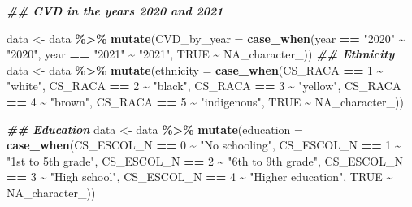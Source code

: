 \documentclass[
]{article}
\newenvironment{Shaded}{\begin{snugshade}}{\end{snugshade}}
\newcommand{\AttributeTok}[1]{\textcolor[rgb]{0.13,0.29,0.53}{#1}}
\newcommand{\ConstantTok}[1]{\textcolor[rgb]{0.56,0.35,0.01}{#1}}
\newcommand{\DecValTok}[1]{\textcolor[rgb]{0.00,0.00,0.81}{#1}}
\newcommand{\DocumentationTok}[1]{\textcolor[rgb]{0.56,0.35,0.01}{\textbf{\textit{#1}}}}
\newcommand{\FunctionTok}[1]{\textcolor[rgb]{0.13,0.29,0.53}{\textbf{#1}}}
\newcommand{\NormalTok}[1]{#1}
\newcommand{\OtherTok}[1]{\textcolor[rgb]{0.56,0.35,0.01}{#1}}
\newcommand{\SpecialCharTok}[1]{\textcolor[rgb]{0.81,0.36,0.00}{\textbf{#1}}}
\newcommand{\StringTok}[1]{\textcolor[rgb]{0.31,0.60,0.02}{#1}}
\begin{document}
\begin{Shaded}
\begin{Highlighting}[]
\DocumentationTok{\#\# CVD in the years 2020 and 2021}

\NormalTok{data }\OtherTok{\textless{}{-}}\NormalTok{ data }\SpecialCharTok{\%\textgreater{}\%} \FunctionTok{mutate}\NormalTok{(}\AttributeTok{CVD\_by\_year =} \FunctionTok{case\_when}\NormalTok{(year }\SpecialCharTok{==} \StringTok{"2020"} \SpecialCharTok{\textasciitilde{}} \StringTok{"2020"}\NormalTok{,}
\NormalTok{                                      year }\SpecialCharTok{==} \StringTok{"2021"} \SpecialCharTok{\textasciitilde{}} \StringTok{"2021"}\NormalTok{,}
                                      \ConstantTok{TRUE} \SpecialCharTok{\textasciitilde{}} \ConstantTok{NA\_character\_}\NormalTok{))}
\DocumentationTok{\#\# Ethnicity}
\NormalTok{data }\OtherTok{\textless{}{-}}\NormalTok{  data }\SpecialCharTok{\%\textgreater{}\%}
  \FunctionTok{mutate}\NormalTok{(}\AttributeTok{ethnicity =} \FunctionTok{case\_when}\NormalTok{(CS\_RACA }\SpecialCharTok{==} \DecValTok{1} \SpecialCharTok{\textasciitilde{}} \StringTok{"white"}\NormalTok{,}
\NormalTok{                             CS\_RACA }\SpecialCharTok{==} \DecValTok{2} \SpecialCharTok{\textasciitilde{}} \StringTok{"black"}\NormalTok{,}
\NormalTok{                             CS\_RACA }\SpecialCharTok{==} \DecValTok{3} \SpecialCharTok{\textasciitilde{}} \StringTok{"yellow"}\NormalTok{,}
\NormalTok{                             CS\_RACA }\SpecialCharTok{==} \DecValTok{4} \SpecialCharTok{\textasciitilde{}} \StringTok{"brown"}\NormalTok{,}
\NormalTok{                             CS\_RACA }\SpecialCharTok{==} \DecValTok{5} \SpecialCharTok{\textasciitilde{}} \StringTok{"indigenous"}\NormalTok{,}
                               \ConstantTok{TRUE} \SpecialCharTok{\textasciitilde{}} \ConstantTok{NA\_character\_}\NormalTok{))}

\DocumentationTok{\#\# Education}
\NormalTok{data }\OtherTok{\textless{}{-}}\NormalTok{ data }\SpecialCharTok{\%\textgreater{}\%}
     \FunctionTok{mutate}\NormalTok{(}\AttributeTok{education =} \FunctionTok{case\_when}\NormalTok{(CS\_ESCOL\_N }\SpecialCharTok{==} \DecValTok{0} \SpecialCharTok{\textasciitilde{}} \StringTok{"No schooling"}\NormalTok{,}
\NormalTok{                        CS\_ESCOL\_N }\SpecialCharTok{==} \DecValTok{1} \SpecialCharTok{\textasciitilde{}} \StringTok{"1st to 5th grade"}\NormalTok{,}
\NormalTok{                        CS\_ESCOL\_N }\SpecialCharTok{==} \DecValTok{2} \SpecialCharTok{\textasciitilde{}} \StringTok{"6th to 9th grade"}\NormalTok{,}
\NormalTok{                        CS\_ESCOL\_N }\SpecialCharTok{==} \DecValTok{3} \SpecialCharTok{\textasciitilde{}} \StringTok{"High school"}\NormalTok{,}
\NormalTok{                        CS\_ESCOL\_N }\SpecialCharTok{==} \DecValTok{4} \SpecialCharTok{\textasciitilde{}} \StringTok{"Higher education"}\NormalTok{,}
                          \ConstantTok{TRUE} \SpecialCharTok{\textasciitilde{}} \ConstantTok{NA\_character\_}\NormalTok{))}


\end{Highlighting}
\end{Shaded}
\end{document}
